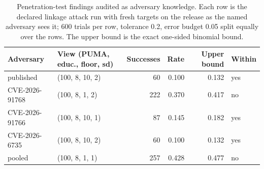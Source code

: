 \begin{table}[htbp]
\centering\small
\caption{Penetration-test findings audited as adversary knowledge. Each row is the declared linkage attack run with fresh targets on the release as the named adversary sees it; 600 trials per row, tolerance 0.2, error budget 0.05 split equally over the rows. The upper bound is the exact one-sided binomial bound.}
\label{tab:pentest}
\begin{tabular}{llrrrl}
\toprule
Adversary & View (PUMA, educ., floor, sd) & Successes & Rate & Upper bound & Within \\
\midrule
published & (100, 8, 10, 2) & 60 & 0.100 & 0.132 & yes \\
CVE-2026-91768 & (100, 8, 1, 2) & 222 & 0.370 & 0.417 & no \\
CVE-2026-91766 & (100, 8, 10, 1) & 87 & 0.145 & 0.182 & yes \\
CVE-2026-6735 & (100, 8, 10, 2) & 60 & 0.100 & 0.132 & yes \\
pooled & (100, 8, 1, 1) & 257 & 0.428 & 0.477 & no \\
\bottomrule
\end{tabular}
\end{table}
